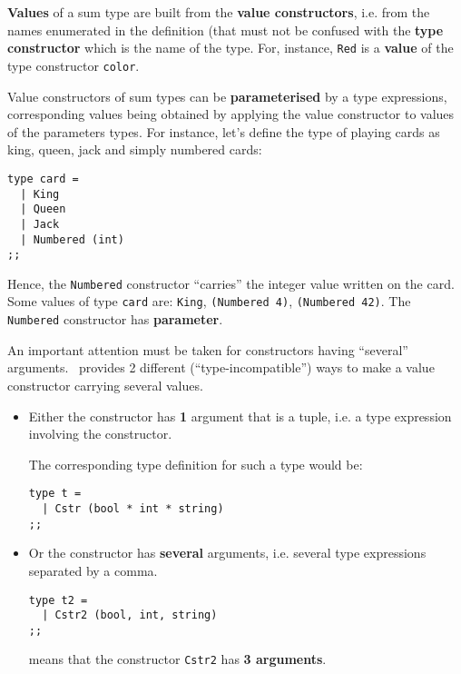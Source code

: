 {\bf Values} of a sum type  are built from the
{\bf value constructors}, i.e. from the names enumerated in the
definition (that must not be confused with the {\bf type constructor}
which is the name of the type. For, instance,
{\tt Red} is a {\bf value} of the type constructor {\tt color}.


Value constructors of sum
types can be {\bf parameterised} by a type expressions, corresponding
values being obtained by applying the value constructor to values of
the parameters types. For instance, let's define the type of playing
cards as king, queen, jack and simply numbered cards:

{\scriptsize
\begin{lstlisting}
type card =
  | King
  | Queen
  | Jack
  | Numbered (int)
;;
\end{lstlisting}
} Hence, the {\tt Numbered} constructor ``carries'' the integer value
written on the card. Some values of type {\tt card} are: {\tt King},
{\tt (Numbered 4)}, {\tt (Numbered 42)}. The {\tt Numbered}
constructor has {\bf parameter}.

\medskip
An important attention must be taken for constructors having
``several'' arguments. \focalize\ provides 2 different
(``type-incompatible'') ways to make a value constructor carrying
several values.
\begin{itemize}
\item Either the constructor has {\bf 1} argument that is a tuple,
  i.e. a type expression involving the {\tt *} constructor.

  The corresponding type definition for such a type would be:
{\scriptsize
\begin{lstlisting}
type t =
  | Cstr (bool * int * string)
;;
\end{lstlisting}
}

\item Or the constructor has {\bf several} arguments, i.e. several
  type expressions separated by a comma.
{\scriptsize
\begin{lstlisting}
type t2 =
  | Cstr2 (bool, int, string)
;;
\end{lstlisting}
}
means that the constructor {\tt Cstr2} has {\bf 3 arguments}.
\end{itemize}

